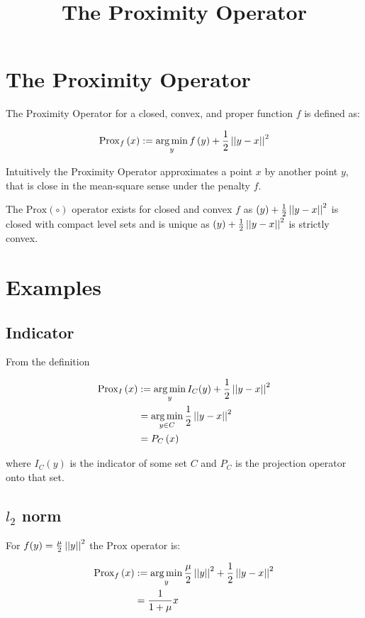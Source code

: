 \documentclass{article}
\title{The Proximity Operator}
\begin{document}
\maketitle

\section{The Proximity Operator}
The Proximity Operator for a closed, convex, and proper function \(f\) is defined as:

\begin{equation}
\mathrm{Prox}_f\left(x\right) :=  \operatorname*{arg\,min}_y f\left(y\right) + \frac{1}{2}\left|\left|y-x\right|\right|^2
\end{equation}

Intuitively the Proximity Operator approximates a point \(x\) by another point \(y\), that is close in the mean-square sense under the penalty \(f\).

The \(\mathrm{Prox}\left(\circ\right)\) operator exists for closed and convex \(f\) as \(\left(y\right) + \frac{1}{2}\left|\left|y-x\right|\right|^2\) is closed with compact level sets and is unique as \(\left(y\right) + \frac{1}{2}\left|\left|y-x\right|\right|^2\) is strictly convex.
\section{Examples}

\subsection{Indicator}
From the definition 

\begin{align}
\mathrm{Prox}_I\left(x\right) &:=  \operatorname*{arg\,min}_y I_C(y) + \frac{1}{2}\left|\left|y-x\right|\right|^2 \\
& = \operatorname*{arg\,min}_{y \in C} \frac{1}{2}\left|\left|y-x\right|\right|^2 \\
& = P_C\left(x\right)
\end{align}

where \(I_C(y)\) is the indicator of some set \(C\) and \(P_C\) is the projection operator onto that set.

\subsection{\(l_2\) norm}
For \(f(y) = \frac{\mu}{2}\left|\left|y\right|\right|^2\) the \(\mathrm{Prox}\) operator is:

\begin{align}
\mathrm{Prox}_f\left(x\right) &:=  \operatorname*{arg\,min}_y \frac{\mu}{2}\left|\left|y\right|\right|^2 + \frac{1}{2}\left|\left|y-x\right|\right|^2 \\
& = \frac{1}{1+\mu}x
\end{align}
\end{document}
